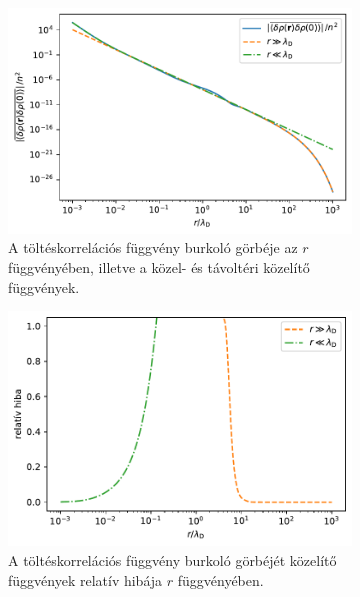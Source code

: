 \documentclass[a4paper,12pt,titlepage]{article}
\begin{document}
\begin{figure}[h!]
	\centering
	\begin{subfigure}[t]{0.48\linewidth}
		\centering
		\includegraphics[width=\linewidth]{rho.pdf}
		\caption{\centering A töltéskorrelációs függvény burkoló görbéje az $r$ függvényében, illetve a közel- \newline és távoltéri közelítő függvények.}
	\end{subfigure}%
	\begin{subfigure}[t]{0.48\linewidth}
		\centering
		\includegraphics[width=0.96\linewidth]{rho_error.pdf}
		\caption{\centering A töltéskorrelációs függvény burkoló görbéjét közelítő függvények relatív hibája \newline $r$ függvényében.}
	\end{subfigure}
	\caption{}
	\label{rho-fig}
\end{figure}
\end{document}
